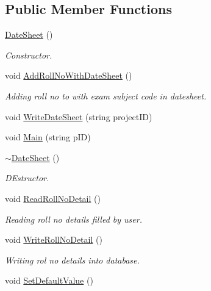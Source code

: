 \subsection*{Public Member Functions}
\begin{DoxyCompactItemize}
\item 
\hyperlink{classDateSheet_a17a1e5adc9b48e53091b89061ee0a360}{Date\-Sheet} ()
\begin{DoxyCompactList}\small\item\em Constructor. \end{DoxyCompactList}\item 
void \hyperlink{classDateSheet_a8c1bd0daf35e3ea6f962a03fe78cdfa3}{Add\-Roll\-No\-With\-Date\-Sheet} ()
\begin{DoxyCompactList}\small\item\em Adding roll no to with exam subject code in datesheet. \end{DoxyCompactList}\item 
void \hyperlink{classDateSheet_a3f7ea57a0ed85dc6c09f0eda9c30016b}{Write\-Date\-Sheet} (string project\-I\-D)
\item 
void \hyperlink{classDateSheet_af749306c14297b5c93c16f48f551d5bb}{Main} (string p\-I\-D)
\item 
\hyperlink{classDateSheet_af17d25ae4f39caf7b9ea62d73541813b}{$\sim$\-Date\-Sheet} ()
\begin{DoxyCompactList}\small\item\em D\-Estructor. \end{DoxyCompactList}\item 
\hypertarget{classDateSheet_a0d68cd26658c7dfc37ef512e6ed30528}{void \hyperlink{classDateSheet_a0d68cd26658c7dfc37ef512e6ed30528}{Read\-Roll\-No\-Detail} ()}\label{classDateSheet_a0d68cd26658c7dfc37ef512e6ed30528}

\begin{DoxyCompactList}\small\item\em Reading roll no details filled by user. \end{DoxyCompactList}\item 
\hypertarget{classDateSheet_ab34e451b5322710f149a1fff5386d852}{void \hyperlink{classDateSheet_ab34e451b5322710f149a1fff5386d852}{Write\-Roll\-No\-Detail} ()}\label{classDateSheet_ab34e451b5322710f149a1fff5386d852}

\begin{DoxyCompactList}\small\item\em Writing rol no details into database. \end{DoxyCompactList}\item 
\hypertarget{classDateSheet_a2eab7d9256cd56064671ac4974846a7a}{void \hyperlink{classDateSheet_a2eab7d9256cd56064671ac4974846a7a}{Set\-Default\-Value} ()}\label{classDateSheet_a2eab7d9256cd56064671ac4974846a7a}


\end{DoxyCompactItemize}
